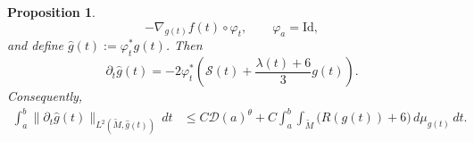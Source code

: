\documentclass[10pt,a4paper]{amsart}
\newtheorem{proposition}{Proposition}
\begin{document}
\begin{proposition}
\[        -\nabla_{g(t)}f(t)\circ\varphi_t,
        \qquad
        \varphi_a=\text{Id},
\]
and define $\widehat g(t):=\varphi_t^*g(t)$. Then
\begin{equation}
\label{eq:modified-Ricci-flow-evolution}
        \partial_t\widehat g(t)
        =
        -2\varphi_t^*
        \left(
        \mathcal S(t)
        +
        \frac{\lambda(t)+6}{3}g(t)
        \right).
\end{equation}
Consequently,
\begin{align}
        \int_a^b
        \|\partial_t\widehat g(t)\|
        _{L^2(\widetilde M,\widehat g(t))}
        \,dt
        &\leq
        C\mathcal D(a)^\theta
        +
        C
        \int_a^b
        \int_{\widetilde M}
        \bigl(R(g(t))+6\bigr)
        \,d\mu_{g(t)}\,dt.
\label{eq:modified-flow-L1L2}
\end{align}
\end{proposition}
\end{document}

